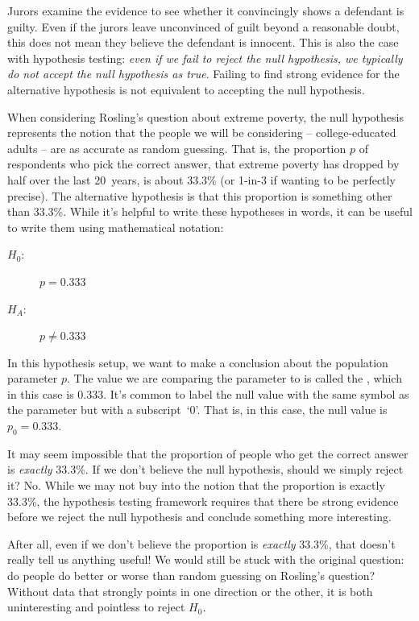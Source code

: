 Jurors examine the evidence to see whether it convincingly
shows a defendant is guilty.
Even if the jurors leave unconvinced of guilt beyond
a reasonable doubt, this does not mean they believe the
defendant is innocent.
This is also the case with hypothesis testing:
\emph{even if we fail to reject the null hypothesis,
we typically do not accept the null hypothesis as true}.
Failing to find strong evidence for the alternative
hypothesis is not equivalent to accepting
the null hypothesis.

When considering Rosling's question about extreme poverty,
the null hypothesis represents the notion that the people
we will be considering -- college-educated adults --
are as accurate as random guessing.
That is, the proportion
$p$ of respondents who pick the correct
answer, that extreme poverty has dropped by half over the
last 20~years, is about 33.3\%
(or 1-in-3 if wanting to be perfectly precise).
The alternative hypothesis is that this proportion is something
other than 33.3\%. While it's helpful to write these hypotheses
in words, it can be useful to write them using mathematical
notation:
\begin{description}
\item[$H_0$:] $p = 0.333$
\item[$H_A$:] $p \neq 0.333$
\end{description}
In this hypothesis setup, we want to make a conclusion about
the population parameter $p$. The value we are comparing the
parameter to is called the , which in this
case is 0.333. It's common to label the null value with the
same symbol as the parameter but with a subscript~`0'.
That is, in this case, the null value is $p_0 = 0.333$.

\begin{examplewrap}
\begin{nexample}{It may seem impossible that the
    proportion of people who get the correct answer
    is \emph{exactly} 33.3\%. If we don't believe the
    null hypothesis, should we simply reject it?}
  \label{fund_managers_sp500_not_reject_H0_interpretation}
  No. While we may not buy into the notion that
  the proportion is exactly 33.3\%, the hypothesis testing
  framework requires that there be strong evidence before
  we reject the null hypothesis and conclude something
  more interesting.

  After all, even if we don't believe the proportion is
  \emph{exactly} 33.3\%, that doesn't really tell us anything
  useful! We would still be stuck with the original question:
  do people do better or worse than random guessing on
  Rosling's question?
  Without data that strongly
  points in one direction or the other, it is both
  uninteresting and pointless to reject $H_0$.
\end{nexample}
\end{examplewrap}

